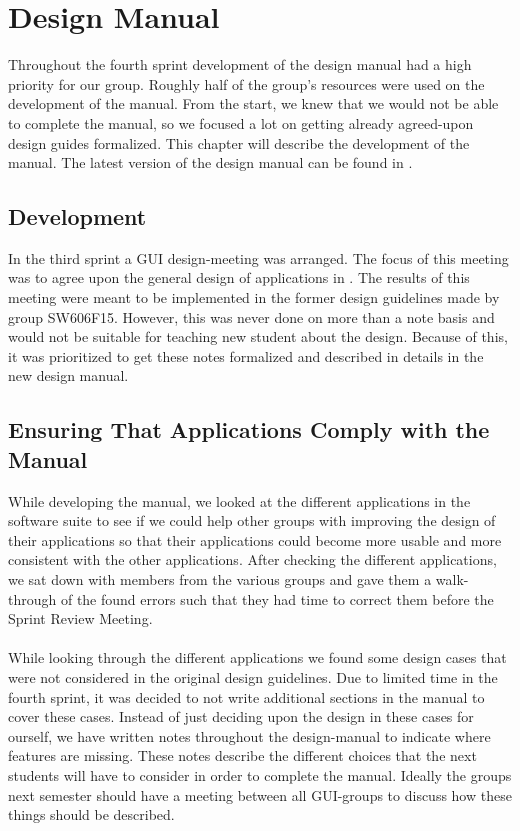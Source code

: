
\chapter{Design Manual}
\label{cha:design_manual}

Throughout the fourth sprint development of the design manual had a high priority for our group. Roughly half of the group's resources were used on the development of the manual. From the start, we knew that we would not be able to complete the manual, so we focused a lot on getting already agreed-upon design guides formalized. This chapter will describe the development of the manual. The latest version of the design manual can be found in .

\section{Development}
\label{sec:development}
In the third sprint a GUI design-meeting was arranged. The focus of this meeting was to agree upon the general design of applications in \giraf. The results of this meeting were meant to be implemented in the former design guidelines made by group SW606F15. However, this was never done on more than a note basis and would not be suitable for teaching new student about the design. Because of this, it was prioritized to get these notes formalized and described in details in the new design manual. 

\section{Ensuring That Applications Comply with the Manual}
\label{sec:ensuring_that_applications_comply_with_the_manual}
While developing the manual, we looked at the different applications in the \giraf software suite to see if we could help other groups with improving the design of their applications so that their applications could become more usable and more consistent with the other applications. After checking the different applications, we sat down with members from the various groups and gave them a walk-through of the found errors such that they had time to correct them before the Sprint Review Meeting. 
\\\\
While looking through the different applications we found some design cases that were not considered in the original design guidelines. Due to limited time in the fourth sprint, it was decided to not write additional sections in the manual to cover these cases. Instead of just deciding upon the design in these cases for ourself, we have written notes throughout the design-manual to indicate where features are missing. These notes describe the different choices that the next students will have to consider in order to complete the manual. Ideally the groups next semester should have a meeting between all GUI-groups to discuss how these things should be described.